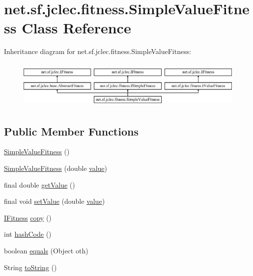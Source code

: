 \hypertarget{classnet_1_1sf_1_1jclec_1_1fitness_1_1_simple_value_fitness}{\section{net.\-sf.\-jclec.\-fitness.\-Simple\-Value\-Fitness Class Reference}
\label{classnet_1_1sf_1_1jclec_1_1fitness_1_1_simple_value_fitness}
}
Inheritance diagram for net.\-sf.\-jclec.\-fitness.\-Simple\-Value\-Fitness\-:\begin{figure}[H]
\begin{center}
\leavevmode
\includegraphics[height=2.372881cm]{classnet_1_1sf_1_1jclec_1_1fitness_1_1_simple_value_fitness}
\end{center}
\end{figure}
\subsection*{Public Member Functions}
\begin{DoxyCompactItemize}
\item 
\hyperlink{classnet_1_1sf_1_1jclec_1_1fitness_1_1_simple_value_fitness_a87f7a78ac9c7b987bd4cbdcd9929c296}{Simple\-Value\-Fitness} ()
\item 
\hyperlink{classnet_1_1sf_1_1jclec_1_1fitness_1_1_simple_value_fitness_a743c2216dff1ba2273791d100c86bc7e}{Simple\-Value\-Fitness} (double \hyperlink{classnet_1_1sf_1_1jclec_1_1fitness_1_1_simple_value_fitness_a65b72c3ad1f1131473e54877c85cd672}{value})
\item 
final double \hyperlink{classnet_1_1sf_1_1jclec_1_1fitness_1_1_simple_value_fitness_a2df5797935ccb451a8e537292e8fee9c}{get\-Value} ()
\item 
final void \hyperlink{classnet_1_1sf_1_1jclec_1_1fitness_1_1_simple_value_fitness_a065805eb9fd5cd6749925b7de0beb979}{set\-Value} (double \hyperlink{classnet_1_1sf_1_1jclec_1_1fitness_1_1_simple_value_fitness_a65b72c3ad1f1131473e54877c85cd672}{value})
\item 
\hyperlink{interfacenet_1_1sf_1_1jclec_1_1_i_fitness}{I\-Fitness} \hyperlink{classnet_1_1sf_1_1jclec_1_1fitness_1_1_simple_value_fitness_a4d7d0ff98c448ac8be309de281ce78d0}{copy} ()
\item 
int \hyperlink{classnet_1_1sf_1_1jclec_1_1fitness_1_1_simple_value_fitness_ae016d1129c153aeae4752e19947ecfb1}{hash\-Code} ()
\item 
boolean \hyperlink{classnet_1_1sf_1_1jclec_1_1fitness_1_1_simple_value_fitness_a5d8f00052d5aa4a2a8824d53b755d1cf}{equals} (Object oth)
\item 
String \hyperlink{classnet_1_1sf_1_1jclec_1_1fitness_1_1_simple_value_fitness_a27e159024db60c66e34ccca03bd35b54}{to\-String} ()
\end{DoxyCompactItemize}
